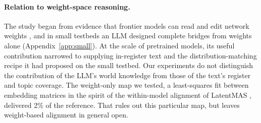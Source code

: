 \paragraph{Relation to weight-space reasoning.}
The study began from evidence that frontier models can read and edit network weights \citep{takehi2026sparks}, and in small testbeds an LLM designed complete bridges from weights alone (Appendix~\ref{app:small}). At the scale of pretrained models, its useful contribution narrowed to supplying in-register text and the distribution-matching recipe it had proposed on the small testbed. Our experiments do not distinguish the contribution of the LLM's world knowledge from those of the text's register and topic coverage. The weight-only map we tested, a least-squares fit between embedding matrices in the spirit of the within-model alignment of LatentMAS \citep{zou2025latentmas}, delivered 2\% of the reference. That rules out this particular map, but leaves weight-based alignment in general open.

